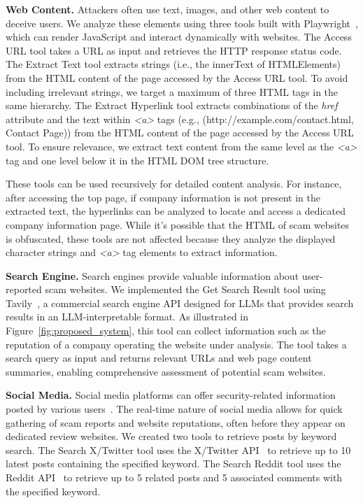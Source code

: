 \documentclass[runningheads]{llncs}
\begin{document}
\noindent\textbf{Web Content.}
Attackers often use text, images, and other web content to deceive users.
We analyze these elements using three tools built with Playwright~\cite{playwright}, which can render JavaScript and interact dynamically with websites.
The Access URL tool takes a URL as input and retrieves the HTTP response status code.
The Extract Text tool extracts strings (i.e., the innerText of HTMLElements) from the HTML content of the page accessed by the Access URL tool.
To avoid including irrelevant strings, we target a maximum of three HTML tags in the same hierarchy.
The Extract Hyperlink tool extracts combinations of the \textit{href} attribute and the text within \textit{<a>} tags (e.g., (http://example.com/contact.html, Contact Page)) from the HTML content of the page accessed by the Access URL tool.
To ensure relevance, we extract text content from the same level as the \textit{<a>} tag and one level below it in the HTML DOM tree structure.

These tools can be used recursively for detailed content analysis.
For instance, after accessing the top page, if company information is not present in the extracted text, the hyperlinks can be analyzed to locate and access a dedicated company information page.
While it's possible that the HTML of scam websites is obfuscated, these tools are not affected because they analyze the displayed character strings and \textit{<a>} tag elements to extract information.

\noindent\textbf{Search Engine.}
Search engines provide valuable information about user-reported scam websites.
We implemented the Get Search Result tool using Tavily~\cite{tavily}, a commercial search engine API designed for LLMs that provides search results in an LLM-interpretable format.
As illustrated in Figure~\ref{fig:proposed_system}, this tool can collect information such as the reputation of a company operating the website under analysis.
The tool takes a search query as input and returns relevant URLs and web page content summaries, enabling comprehensive assessment of potential scam websites.

\noindent\textbf{Social Media.}
Social media platforms can offer security-related information posted by various users~\cite{DBLP:conf/sp/BitaabCOLWAWBSD23,DBLP:conf/ccs/TangML0022}.
The real-time nature of social media allows for quick gathering of scam reports and website reputations, often before they appear on dedicated review websites.
We created two tools to retrieve posts by keyword search.
The Search X/Twitter tool uses the X/Twitter API~\cite{twitter_api} to retrieve up to 10 latest posts containing the specified keyword.
The Search Reddit tool uses the Reddit API~\cite{reddit_api} to retrieve up to 5 related posts and 5 associated comments with the specified keyword.
\end{document}
